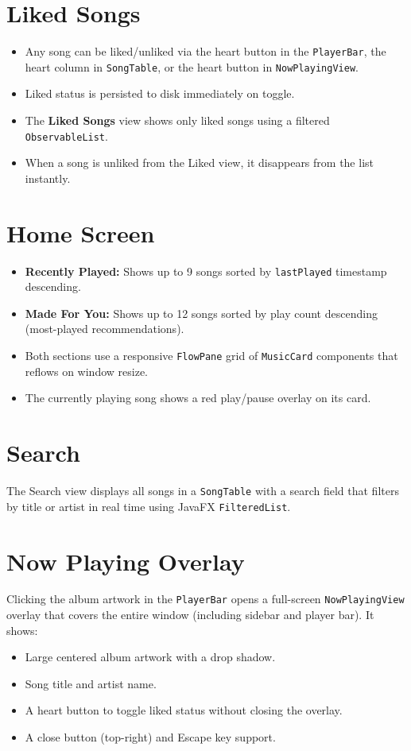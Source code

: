 ﻿\documentclass[12pt]{report}
\begin{document}
\section{Liked Songs}
\begin{itemize}
    \item Any song can be liked/unliked via the heart button in the \texttt{PlayerBar}, the heart column in \texttt{SongTable}, or the heart button in \texttt{NowPlayingView}.
    \item Liked status is persisted to disk immediately on toggle.
    \item The \textbf{Liked Songs} view shows only liked songs using a filtered \texttt{ObservableList}.
    \item When a song is unliked from the Liked view, it disappears from the list instantly.
\end{itemize}

\section{Home Screen}
\begin{itemize}
    \item \textbf{Recently Played:} Shows up to 9 songs sorted by \texttt{lastPlayed} timestamp descending.
    \item \textbf{Made For You:} Shows up to 12 songs sorted by play count descending (most-played recommendations).
    \item Both sections use a responsive \texttt{FlowPane} grid of \texttt{MusicCard} components that reflows on window resize.
    \item The currently playing song shows a red play/pause overlay on its card.
\end{itemize}

\section{Search}
The Search view displays all songs in a \texttt{SongTable} with a search field that filters by title or artist in real time using JavaFX \texttt{FilteredList}.

\section{Now Playing Overlay}
Clicking the album artwork in the \texttt{PlayerBar} opens a full-screen \texttt{NowPlayingView} overlay that covers the entire window (including sidebar and player bar). It shows:
\begin{itemize}
    \item Large centered album artwork with a drop shadow.
    \item Song title and artist name.
    \item A heart button to toggle liked status without closing the overlay.
    \item A close button (top-right) and Escape key support.
\end{itemize}
\end{document}
